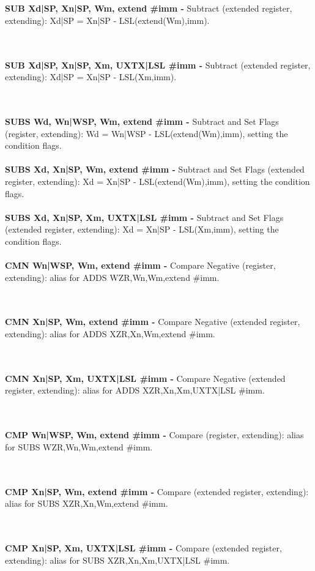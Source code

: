 \documentclass[12pt,a4paper,utf8]{ppgsi}
\begin{document}
\\\\\textbf{SUB Xd|SP, Xn|SP, Wm, extend {#imm} -} Subtract (extended register, extending): Xd|SP = Xn|SP - LSL(extend(Wm),imm). 

\\\\\textbf{SUB Xd|SP, Xn|SP, Xm{, UXTX|LSL #imm} -} Subtract (extended register, extending): Xd|SP = Xn|SP - LSL(Xm,imm). 

\\\\\textbf{SUBS Wd, Wn|WSP, Wm, extend {#imm} -} Subtract and Set Flags (register, extending): Wd = Wn|WSP - LSL(extend(Wm),imm), setting the
condition flags. 
\\\\\textbf{SUBS Xd, Xn|SP, Wm, extend {#imm} -} Subtract and Set Flags (extended register, extending): Xd = Xn|SP - LSL(extend(Wm),imm),
setting the condition flags. 
\\\\\textbf{SUBS Xd, Xn|SP, Xm{, UXTX|LSL #imm} -} Subtract and Set Flags (extended register, extending): Xd = Xn|SP - LSL(Xm,imm), setting the
condition flags. 
\\\\\textbf{CMN Wn|WSP, Wm, extend {#imm} -} Compare Negative (register, extending): alias for ADDS WZR,Wn,Wm,extend {#imm}. 

\\\\\textbf{CMN Xn|SP, Wm, extend {#imm} -} Compare Negative (extended register, extending): alias for ADDS XZR,Xn,Wm,extend {#imm}. 

\\\\\textbf{CMN Xn|SP, Xm{, UXTX|LSL #imm} -} Compare Negative (extended register, extending): alias for ADDS XZR,Xn,Xm{,UXTX|LSL #imm}. 

\\\\\textbf{CMP Wn|WSP, Wm, extend {#imm} -} Compare (register, extending): alias for SUBS WZR,Wn,Wm,extend {#imm}. 

\\\\\textbf{CMP Xn|SP, Wm, extend {#imm} -} Compare (extended register, extending): alias for SUBS XZR,Xn,Wm,extend {#imm}. 

\\\\\textbf{CMP Xn|SP, Xm{, UXTX|LSL #imm} -} Compare (extended register, extending): alias for SUBS XZR,Xn,Xm{,UXTX|LSL #imm}. 
\end{document}
